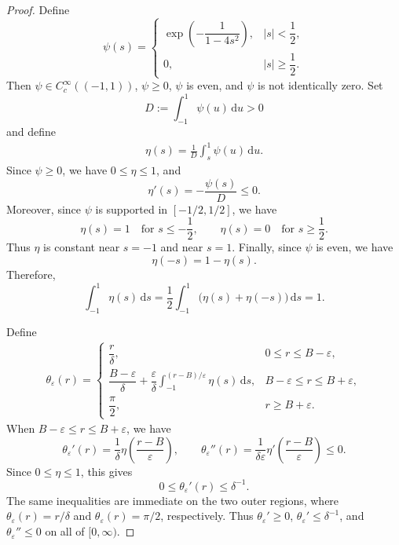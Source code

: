 \documentclass[11pt,reqno]{amsart}
\numberwithin{equation}{section}
\theoremstyle{definition}
\theoremstyle{remark}
\newcommand{\te}{\theta}
\newcommand{\ud}{\mathrm{d}}
\newcommand{\0}{\emptyset}
\newcommand{\veps}{\varepsilon}
\begin{document}
\begin{proof}
Define
\[
        \psi(s)
        =
        \begin{cases}
        \exp\!\left(-\dfrac{1}{1-4s^2}\right),& |s|<\dfrac12,\\[6pt]
        0,& |s|\geq \dfrac12.
        \end{cases}
\]
Then \(\psi\in C_c^\infty((-1,1))\), \(\psi\geq0\), \(\psi\) is even, and
\(\psi\) is not identically zero. Set
\[
        D:=\int_{-1}^1\psi(u)\,\ud u>0
\]
and define
\begin{align}
        \eta(s)
        =
        \frac{1}{D}\int_s^1\psi(u)\,\ud u .
\end{align}
Since \(\psi\geq0\), we have \(0\leq\eta\leq1\), and
\[
        \eta'(s)=-\frac{\psi(s)}{D}\leq0.
\]
Moreover, since \(\psi\) is supported in \([-1/2,1/2]\), we have
\[
        \eta(s)=1\quad\text{for }s\leq -\frac12,
        \qquad
        \eta(s)=0\quad\text{for }s\geq \frac12.
\]
Thus \(\eta\) is constant near \(s=-1\) and near \(s=1\). Finally, since
\(\psi\) is even, we have
\[
        \eta(-s)=1-\eta(s).
\]
Therefore,
\[
        \int_{-1}^1\eta(s)\,\ud s
        =
        \frac12\int_{-1}^1\bigl(\eta(s)+\eta(-s)\bigr)\,\ud s
        =
        1.
\]

Define
\begin{align}
        \te_\veps(r)=
        \begin{cases}
        \dfrac{r}{\delta},&0\leq r\leq B-\veps,\\[6pt]
        \dfrac{B-\veps}{\delta}
        +\dfrac{\veps}{\delta}
        \displaystyle\int_{-1}^{(r-B)/\veps}\eta(s)\,\ud s,
        &B-\veps\leq r\leq B+\veps,\\[12pt]
        \dfrac{\pi}{2},&r\geq B+\veps.
        \end{cases}
\end{align}
When \(B-\veps\leq r\leq B+\veps\), we have
\[
        \te_\veps'(r)
        =
        \frac{1}{\delta}\eta\!\left(\frac{r-B}{\veps}\right),
        \qquad
        \te_\veps''(r)
        =
        \frac{1}{\delta\veps}
        \eta'\!\left(\frac{r-B}{\veps}\right)
        \leq0.
\]
Since \(0\leq\eta\leq1\), this gives
\[
        0\leq \te_\veps'(r)\leq \delta^{-1}.
\]
The same inequalities are immediate on the two outer regions, where
\(\te_\veps(r)=r/\delta\) and \(\te_\veps(r)=\pi/2\), respectively. Thus
\(\te_\veps'\geq0\), \(\te_\veps'\leq\delta^{-1}\), and
\(\te_\veps''\leq0\) on all of \([0,\infty)\).
\end{proof}
\end{document}
